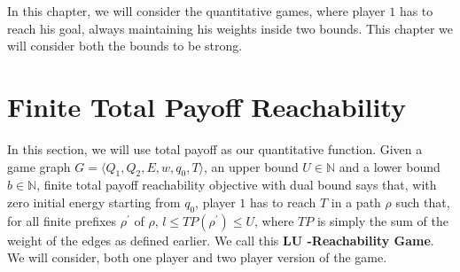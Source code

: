 In this chapter, we will consider the quantitative games, where player $1$ has to reach his goal, always maintaining his weights inside two bounds. This chapter we will consider both the bounds to be strong.

\section{Finite Total Payoff Reachability}

In this section, we will use total payoff as our quantitative function. Given a game graph $G=\langle Q_1, Q_2, E, w, q_0, T \rangle$, an upper bound $U \in \mathbb{N}$ and a lower bound $b \in \mathbb{N}$, finite total payoff reachability objective with dual bound says that, with zero initial energy starting from $q_0$, player $1$ has to reach $T$ in a path $\rho$ such that, for all finite prefixes $\rho^{\prime}$ of $\rho$, $l\leq TP(\rho^{\prime})\leq U$, where $TP$ is simply the sum of the weight of the edges as defined earlier. We call this \textbf{LU -Reachability Game}. We will consider, both one player and two player version of the game. 

